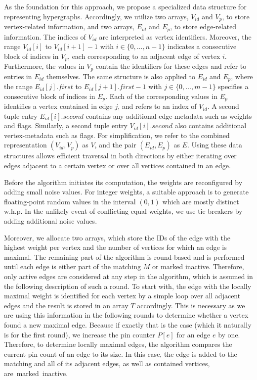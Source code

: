 \documentclass[runningheads]{llncs}
\begin{document}
As the foundation for this approach, we propose a specialized data structure for representing hypergraphs. Accordingly, we utilize two arrays, $V_{id}$ and $V_{p}$, to store vertex-related information, and two arrays, $E_{id}$ and $E_{p}$, to store edge-related information. The indices of $V_{id}$ are interpreted as vertex identifiers. Moreover, the range $V_{id}[i]$ to $V_{id}[i+1]-1$ with $i \in \{0, \dots, n-1\}$ indicates a consecutive block of indices in $V_{p}$, each corresponding to an adjacent edge of vertex $i$. Furthermore, the values in $V_{p}$ contain the identifiers for these edges and refer to entries in $E_{id}$ themselves. The same structure is also applied to $E_{id}$ and $E_{p}$, where the range $E_{id}[j].first$ to $E_{id}[j+1].first - 1$ with $j \in \{0, \dots, m-1\}$ specifies a consecutive block of indices in $E_{p}$. Each of the corresponding values in $E_{p}$ identifies a vertex contained in edge $j$, and refers to an index of $V_{id}$. A second tuple entry $E_{id}[i].second$ contains any additional edge-metadata such as weights and flags. Similarly, a second tuple entry $V_{id}[i].second$ also contains additional vertex-metadata such as flags. For simplification, we refer to the combined representation $(V_{id}, V_{p})$ as $V$, and the pair $(E_{id}, E_{p})$ as $E$. Using these data structures allows efficient traversal in both directions by either iterating over edges adjacent to a certain vertex or over all vertices contained in an edge. 

Before the algorithm initiates its computation, the weights are reconfigured by adding small noise values. For integer weights, a suitable approach is to generate floating-point random values in the interval $(0,1)$ which are mostly distinct w.h.p. %
In the unlikely event of conflicting equal weights, we use tie breakers by adding additional noise values.

Moreover, we allocate  two arrays, which store the IDs of the edge with the highest weight per vertex and the number of vertices for which an edge is maximal.
The remaining part of the algorithm is round-based and is performed until each edge is either part of the matching $M$ or marked inactive. Therefore, only active edges are considered at any step in the algorithm, which is assumed in the following description of such a round.
To start with, the edge with the locally maximal weight is identified for each vertex by a simple loop over all adjacent edges and the result is stored in an array $T$ accordingly. This is necessary as we are using this information in the following rounds to determine whether a vertex found a new maximal edge. %
Because if exactly that is the case (which it naturally is for the first round), we increase the pin counter $P[e]$ for an edge $e$ by one. 
Therefore, to determine locally maximal edges, the algorithm compares the current pin count of an edge to its size. In this case, the edge is added to the matching and all of its adjacent edges, as well as contained vertices, \hbox{are marked inactive.}
\end{document}

